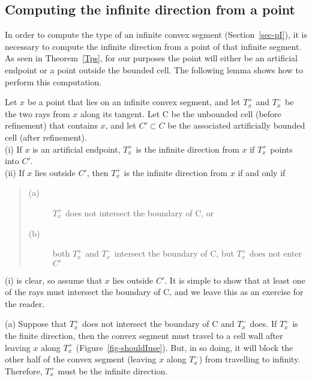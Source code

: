 \subsection{Computing the infinite direction from a point}

In order to compute the type of an infinite convex segment (Section~\ref{sec-pI}), 
it is necessary to compute the infinite direction from a point of that infinite segment.
As seen in Theorem~\ref{Tps}, for our purposes the point will either be an artificial
endpoint or a point outside the bounded cell.
The following lemma shows how to perform this computation.

\begin{lemma}
\label{lem-ty}
Let $x$ be a point that lies on an infinite convex segment,
and let $T_{x}^{+}$ and $T_{x}^{-}$ be the two rays from $x$ along its tangent.
Let C be the unbounded cell (before refinement) that contains $x$, and 
let $C' \subset C$ be the associated artificially bounded cell (after refinement).\\
(i) If $x$ is an artificial endpoint,
$T_{x}^{+}$ is the infinite direction from $x$ if 
$T_{x}^{+}$ points into $C'$.\\
(ii) If $x$ lies outside $C'$, then 
$T_{x}^{+}$ is the infinite direction from $x$ if and only if
\begin{quote}
\begin{description}
\item[(a)] $T_{x}^{+}$ does not intersect the boundary of C, or
\item[(b)] both $T_{x}^{+}$ and $T_{x}^{-}$ intersect the boundary of C, but $T_{x}^{+}$ 
does not enter $C'$
\end{description}
\end{quote}
\end{lemma}
(i) is clear, so assume that $x$ lies outside $C'$.
It is simple to show that at least one of the rays must intersect the boundary
of C, and we leave this as an exercise for the reader.

(a) Suppose that $T_{x}^{+}$ does not intersect the boundary of C and $T_{x}^{-}$ does.
If $T_{x}^{+}$ is the finite direction,
then the convex segment must travel to a cell wall after leaving $x$ along $T_{x}^{+}$
(Figure~\ref{fig-shouldIuse}).
But, in so doing, it will block the other half of the convex segment 
(leaving $x$ along $T_{x}^{-}$) from travelling to infinity.
Therefore, $T_{x}^{+}$ must be the infinite direction.

